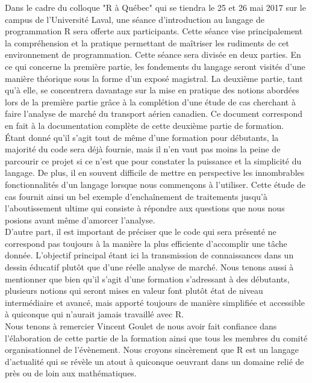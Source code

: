 Dans le cadre du colloque "R à Québec" qui se tiendra le 25 et 26 mai 2017 sur le campus de l'Université Laval, une séance d'introduction au langage de programmation R sera offerte aux participants. Cette séance vise principalement la compréhension et la pratique permettant de maîtriser les rudiments de cet environnement de programmation. \cite{RQC2017} Cette séance sera divisée en deux parties. En ce qui concerne la première partie, les fondements du langage seront visités d'une manière théorique sous la forme d'un exposé magistral. La deuxième partie, tant qu'à elle, se concentrera davantage sur la mise en pratique des notions abordées lors de la première partie grâce à la complétion d'une étude de cas cherchant à faire l'analyse de marché du transport aérien canadien. Ce document correspond en fait à la documentation complète de cette deuxième partie de formation. \\

Étant donné qu'il s'agit tout de même d'une formation pour débutants, la majorité du code sera déjà fournie, mais il n'en vaut pas moins la peine de parcourir ce projet si ce n'est que pour constater la puissance et la simplicité du langage. De plus, il en souvent difficile de mettre en perspective les innombrables fonctionnalités d'un langage lorsque nous commençons à l'utiliser. Cette étude de cas fournit ainsi un bel exemple d'enchaînement de traitements jusqu'à l'aboutissement ultime qui consiste à répondre aux questions que nous nous posions avant même d'amorcer l'analyse. \\

D'autre part, il est important de préciser que le code qui sera présenté ne correspond pas toujours à la manière la plus efficiente d'accomplir une tâche donnée. L'objectif principal étant ici la transmission de connaissances dans un dessin éducatif plutôt que d'une réelle analyse de marché. Nous tenons aussi à mentionner que bien qu'il s'agit d'une formation s'adressant à des débutants, plusieurs notions qui seront mises en valeur font plutôt état de niveau intermédiaire et avancé, mais apporté toujours de manière simplifiée et accessible à quiconque qui n'aurait jamais travaillé avec R. \\

Nous tenons à remercier Vincent Goulet de nous avoir fait confiance dans l'élaboration de cette partie de la formation ainsi que tous les membres du comité organisationnel de l'évènement. Nous croyons sincèrement que R est un langage d'actualité qui se révèle un atout à quiconque oeuvrant dans un domaine relié de près ou de loin aux mathématiques. \\